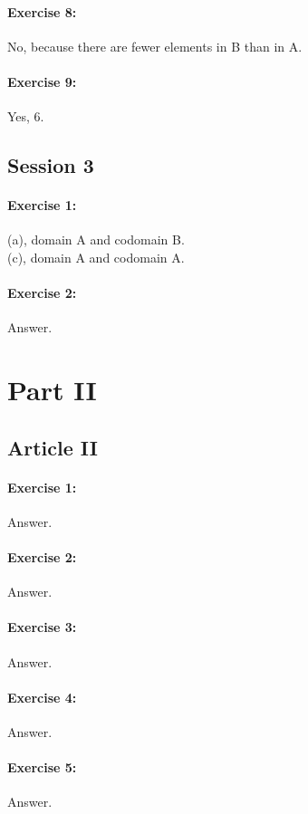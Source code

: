 \documentclass{article}
\begin{document}
\paragraph{Exercise 8:}
No, because there are fewer elements in B than in A.
\paragraph{Exercise 9:}
Yes, 6.
\newpage

\subsection*{Session 3}
\paragraph{Exercise 1:}
(a), domain A and codomain B.\\
(c), domain A and codomain A.
\paragraph{Exercise 2:}
Answer.
\newpage

\section*{Part II}

\subsection*{Article II}
\paragraph{Exercise 1:}
Answer.
\paragraph{Exercise 2:}
Answer.
\paragraph{Exercise 3:}
Answer.
\paragraph{Exercise 4:}
Answer.
\paragraph{Exercise 5:}
Answer.
\end{document}
